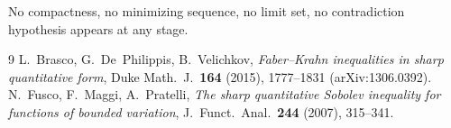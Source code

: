 \documentclass[11pt]{article}
\theoremstyle{definition}
\begin{document}
No compactness, no minimizing sequence, no limit set, no contradiction
hypothesis appears at any stage.

\begin{thebibliography}{9}
 L.~Brasco, G.~De~Philippis, B.~Velichkov,
\emph{Faber--Krahn inequalities in sharp quantitative form},
Duke Math.\ J.\ \textbf{164} (2015), 1777--1831 (arXiv:1306.0392).
 N.~Fusco, F.~Maggi, A.~Pratelli,
\emph{The sharp quantitative Sobolev inequality for functions of bounded
variation}, J.~Funct.~Anal.\ \textbf{244} (2007), 315--341.
\end{thebibliography}
\end{document}

